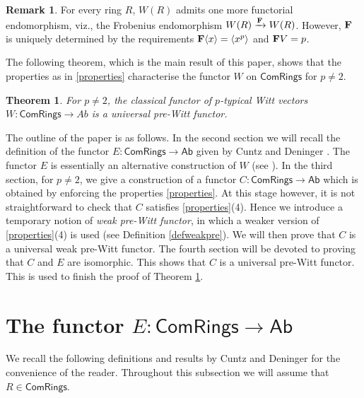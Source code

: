 \documentclass[10pt]{amsart}
\theoremstyle{plain}
\newtheorem{theorem}[thm]{Theorem}
\theoremstyle{definition}
\newtheorem{remark}[thm]{Remark}
\newcommand{\ab}[1]{\langle {#1} \rangle}
\newcommand{\Com}{{\mathsf{ComRings}}}
\begin{document}
\begin{remark}
For every ring $R$, $W(R)$ admits one more functorial endomorphism, viz., the Frobenius endomorphism $W(R)\xrightarrow{\bf{F}}W(R)$. However, $\bf{F}$ is uniquely determined by the requirements ${\bf F}\ab{x}=\ab{x^p}$ and ${\bf F}V=p$.  
\end{remark}

\noindent The following theorem, which is the main result of this paper, shows that the properties as in  \ref{properties} characterise the functor $W$ on $\Com$ for $p\neq 2$.

\begin{theorem}\label{univcom} For $p\neq 2$, the classical functor of $p$-typical Witt vectors
$W: \Com \to Ab$ is a universal pre-Witt functor.

\end{theorem}
\vspace{2mm}

\noindent The outline of the paper is as follows. In the second section we will recall the definition of the functor $E: \Com \to \mathsf{Ab}$ given by Cuntz and Deninger \cite{cd}. The functor $E$ is essentially an alternative construction of $W$ (see \cite[page 561]{cd}). In the third section, for $p\neq 2$, we give a construction of a functor $C: \Com \to \mathsf{Ab}$ which is obtained by enforcing the properties \ref{properties}. At this stage however, it is not straightforward to check that $C$ satisfies \ref{properties}(4). Hence we introduce a temporary notion of {\it weak  pre-Witt functor}, in which a weaker version of \ref{properties}(4) is used (see Definition \ref{defweakpre}). We will then prove that $C$ is a universal weak pre-Witt functor. The fourth section will be devoted to proving that $C$ and $E$  are isomorphic. This shows that $C$ is a universal pre-Witt functor. This is used to finish the proof of Theorem \ref{univcom}.

\section{The functor $E: \Com \to \mathsf{Ab}$}

\noindent We recall the following definitions and results by Cuntz and Deninger \cite{cd} for the convenience of the reader. Throughout this subsection we will assume that $R \in \Com$.
\end{document}
